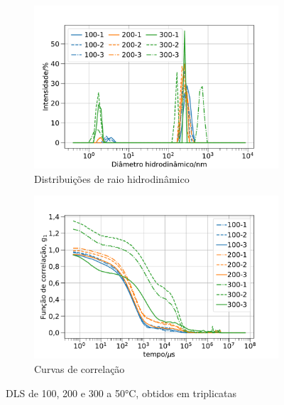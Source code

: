 \begin{figure}[h]
	\begin{subfigure}{0.50\textwidth}
		\centering
		\includegraphics[width=\textwidth]{imagens/dls/ctab_distrib}
		\caption{Distribuições de raio hidrodinâmico}
		\label{fig:DLS_ctab_distrib}
	\end{subfigure} %
	\begin{subfigure}{0.50\textwidth}
		\centering
		\includegraphics[width=\textwidth]{imagens/dls/ctab_CC}
		\caption{Curvas de correlação}
		\label{fig:DLS_ctab_cc}
	\end{subfigure}
	\caption{DLS de \CTAB{} 100, 200 e 300 \mM{} a 50°C, obtidos em triplicatas}
	\label{fig:DLS_ctab}
\end{figure}

